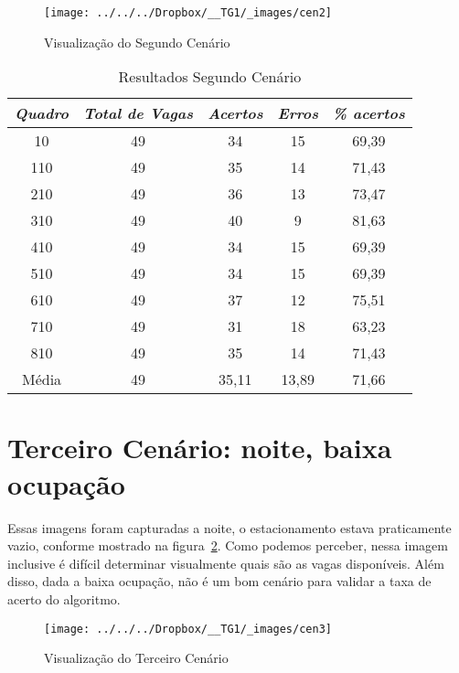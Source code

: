 \documentclass[ecp,tc]{iiufrgs}
\begin{document}
\begin{figure}
	\centering
	\caption{Visualização do Segundo Cenário}
	\texttt{[image: ../../../Dropbox/\_\_TG1/\_images/cen2]}
	\label{fig:cen2}
\end{figure}

\begin{table}
	\caption{Resultados Segundo Cenário}
	\begin{center}
		\begin{tabular}{c|c|c|c|c}
			\textit{Quadro}  &   \textit{Total de Vagas}  &   \textit{Acertos} & \textit{Erros} & \textit{\% acertos} \\
			\hline
			\hline
			10 & 49 & 34 & 15 & 69,39 \\
			\hline
			110 & 49 & 35 & 14 &  71,43 \\
			\hline
			210 & 49 & 36 & 13 & 73,47 \\
			\hline
			310 & 49 & 40 & 9 & 81,63 \\
			\hline
			410 & 49 & 34 & 15 & 69,39 \\
			\hline
			510 & 49 & 34 & 15 & 69,39 \\
			\hline
			610 & 49 & 37 & 12 & 75,51 \\
			\hline
			710 & 49 & 31 & 18 & 63,23\\
			\hline
			810 & 49 & 35 & 14 & 71,43 \\
			\hline
			Média & 49 & 35,11 & 13,89 & 71,66 \\
			\hline
		\end{tabular}
	\end{center}
	\label{tbl:cen2}
\end{table}



\section{Terceiro Cenário: noite, baixa ocupação}

Essas imagens foram capturadas a noite, o estacionamento estava praticamente vazio, conforme mostrado na figura~\ref{fig:cen3}. Como podemos perceber, nessa imagem inclusive é difícil determinar visualmente quais são as vagas disponíveis. Além disso, dada a baixa ocupação, não é um bom cenário para validar a taxa de acerto do algoritmo.

\begin{figure}
	\centering
	\caption{Visualização do Terceiro Cenário}
	\texttt{[image: ../../../Dropbox/\_\_TG1/\_images/cen3]}
	\label{fig:cen3}
\end{figure}
\end{document}
